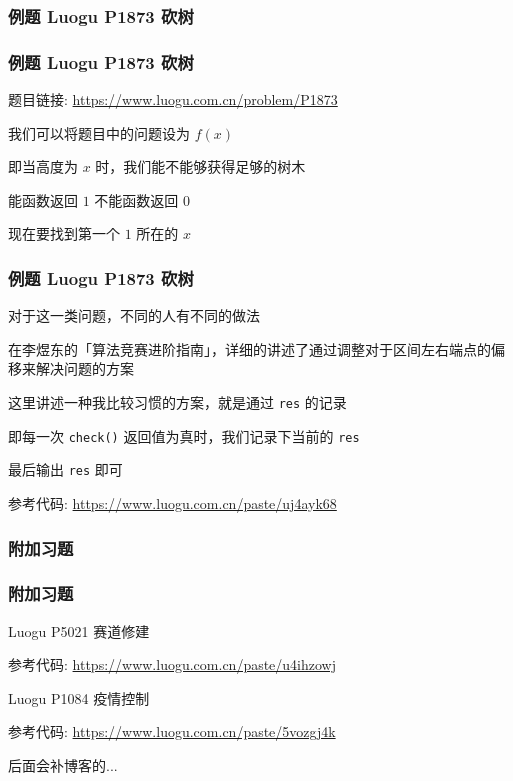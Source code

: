 \documentclass[10pt]{beamer}
\begin{document}
	\subsubsection{例题 Luogu P1873 砍树}
	\begin{frame}
		\frametitle{例题 Luogu P1873 砍树}
		题目链接: \href{https://www.luogu.com.cn/problem/P1873}{https://www.luogu.com.cn/problem/P1873}

		我们可以将题目中的问题设为 $f(x)$

		即当高度为 $x$ 时，我们能不能够获得足够的树木

		\pause

		能函数返回 $1$ 不能函数返回 $0$

		\pause

		现在要找到第一个 $1$ 所在的 $x$ 
	\end{frame}
	\begin{frame}
		\frametitle{例题 Luogu P1873 砍树}
		对于这一类问题，不同的人有不同的做法

		\pause

		在李煜东的「算法竞赛进阶指南」，详细的讲述了通过调整对于区间左右端点的偏移来解决问题的方案

		\pause

		这里讲述一种我比较习惯的方案，就是通过 \texttt{res} 的记录

		即每一次 \texttt{check()} 返回值为真时，我们记录下当前的 \texttt{res}

		最后输出 \texttt{res} 即可

		\pause

		参考代码: \href{https://www.luogu.com.cn/paste/uj4ayk68}{https://www.luogu.com.cn/paste/uj4ayk68}
	\end{frame}
	
	\subsubsection{附加习题}
	\begin{frame}
		\frametitle{附加习题}
		Luogu P5021 赛道修建

		参考代码: \href{https://www.luogu.com.cn/paste/u4ihzowj}{https://www.luogu.com.cn/paste/u4ihzowj}

		\pause

		Luogu P1084 疫情控制

		参考代码: \href{https://www.luogu.com.cn/paste/5vozgj4k}{https://www.luogu.com.cn/paste/5vozgj4k}

		后面会补博客的...
	\end{frame}
\end{document}
